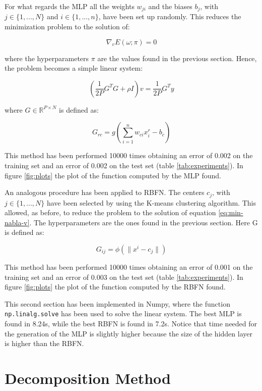 \documentclass[a4paper]{article}
\numberwithin{equation}{section} %
\numberwithin{figure}{section} %
\numberwithin{table}{section} %
\theoremstyle{definition}
\begin{document}
For what regards the MLP all the weights $w_{ji}$ and the biases $b_j$, with
$j \in \{ 1, ..., N \} $ and $i \in \{ 1, ..., n \} $, have been set up
randomly. This reduces the minimization problem to the solution of:

\begin{equation}
 	\label{eq:min-nabla-v}
	\nabla_v E(\omega; \pi) = 0
\end{equation}

\noindent where the hyperparameters $\pi$ are the values found in the previous
section. Hence, the problem becomes a simple linear system:

\[ \left( \frac{1}{2P} G^T G + \rho I \right) v = \frac{1}{2P} G^T y \]

\noindent where $G \in \mathbb{R}^{P \times N}$ is defined as:

\[ G_{rc} = g\left( \sum_{i=1}^{n} w_{ci}x_i^r - b_c \right) \]

This method has been performed 10000 times obtaining an error of 0.002 on the
training set and an error of 0.002 on the test set (table \ref{tab:experiments}). In figure
\ref{fig:plots} the plot of the function computed by the MLP found.

An analogous procedure has been applied to RBFN.
The centers $c_j$, with $ j \in \{ 1,  ..., N \} $ have been selected by
using the K-means clustering algorithm. This allowed, as before, to reduce the
problem to the solution of equation \ref{eq:min-nabla-v}. The hyperparameters
are the ones found in the previous section. Here G is defined as:

\[ G_{ij} = \phi\left( \| x^i - c_j \| \right) \]

This method has been performed 10000 times obtaining an error of 0.001 on the
training set and an error of 0.003 on the test set (table \ref{tab:experiments}). In figure
\ref{fig:plots} the plot of the function computed by the RBFN found.

This second section has been implemented in Numpy, where the function
\texttt{np.linalg.solve} has been used to solve the linear system. The best MLP
is found in 8.24s, while the best RBFN is found in 7.2s. Notice that time
needed for the  generation of the MLP is slightly higher because the size of
the hidden layer is higher than the RBFN.


\section{Decomposition Method}
\end{document}
